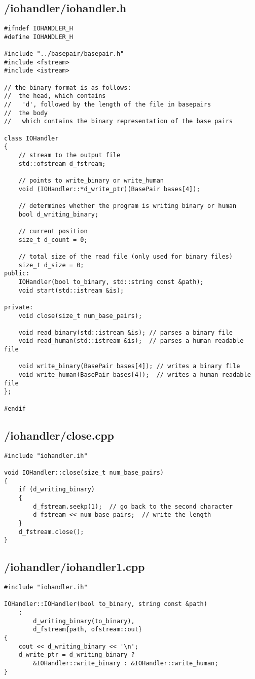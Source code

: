 \documentclass{article}
\begin{document}
\subsection*{/iohandler/iohandler.h}
\begin{verbatim}
#ifndef IOHANDLER_H
#define IOHANDLER_H

#include "../basepair/basepair.h"
#include <fstream>
#include <istream>

// the binary format is as follows:
//  the head, which contains
//   'd', followed by the length of the file in basepairs
//  the body
//   which contains the binary representation of the base pairs

class IOHandler
{
    // stream to the output file
    std::ofstream d_fstream;

    // points to write_binary or write_human
    void (IOHandler::*d_write_ptr)(BasePair bases[4]);

    // determines whether the program is writing binary or human
    bool d_writing_binary;

    // current position
    size_t d_count = 0;

    // total size of the read file (only used for binary files)
    size_t d_size = 0;
public:
    IOHandler(bool to_binary, std::string const &path);
    void start(std::istream &is);

private:
    void close(size_t num_base_pairs);

    void read_binary(std::istream &is); // parses a binary file
    void read_human(std::istream &is);  // parses a human readable file

    void write_binary(BasePair bases[4]); // writes a binary file
    void write_human(BasePair bases[4]);  // writes a human readable file
};

#endif
\end{verbatim}
\subsection*{/iohandler/close.cpp}
\begin{verbatim}
#include "iohandler.ih"

void IOHandler::close(size_t num_base_pairs)
{
    if (d_writing_binary)
    {
        d_fstream.seekp(1);  // go back to the second character
        d_fstream << num_base_pairs;  // write the length
    }
    d_fstream.close();
}
\end{verbatim}
\subsection*{/iohandler/iohandler1.cpp}
\begin{verbatim}
#include "iohandler.ih"

IOHandler::IOHandler(bool to_binary, string const &path)
    :
        d_writing_binary(to_binary),
        d_fstream{path, ofstream::out}
{
    cout << d_writing_binary << '\n';
    d_write_ptr = d_writing_binary ?
        &IOHandler::write_binary : &IOHandler::write_human;
}

\end{verbatim}
\end{document}
